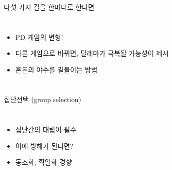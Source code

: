 \documentclass[final]{beamer}
\begin{document}
\begin{frame}[t]{다섯 가지 길을 한마디로 한다면}
	\begin{columns}[c]
		\column{12em}
		\begin{itemize}
			\item PD 게임의 변형! 
			\item 다른 게임으로 바뀌면, 딜레마가 극복될 가능성이 제시
			\item 혼돈의 야수를 길들이는 방법
		\end{itemize}
		\column{18em}
	\end{columns}
\end{frame}

\begin{frame}[t]{집단선택 (group selection)}
	\begin{columns}[c]
		\column{12em}
		\begin{itemize}
			\item 집단간의 대립이 필수
			\item 이에 방해가 된다면?
			\item 동조화, 획일화 경향
		\end{itemize}
		\column{18em}
	\end{columns}
\end{frame}
\end{document}
